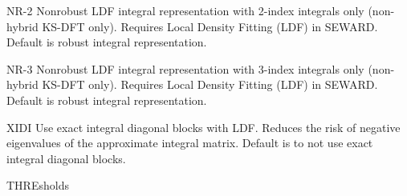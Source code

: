 \begin{keywordlist}
\item[NR-2]
Nonrobust LDF integral representation with 2-index integrals only (non-hybrid KS-DFT only).
Requires Local Density Fitting (LDF) in SEWARD. Default is robust integral representation.
\item[NR-3]
Nonrobust LDF integral representation with 3-index integrals only (non-hybrid KS-DFT only).
Requires Local Density Fitting (LDF) in SEWARD. Default is robust integral representation.
\item[XIDI]
Use exact integral diagonal blocks with LDF.
Reduces the risk of negative eigenvalues of the approximate integral matrix.
Default is to not use exact integral diagonal blocks.
\item[THREsholds]

\end{keywordlist}
